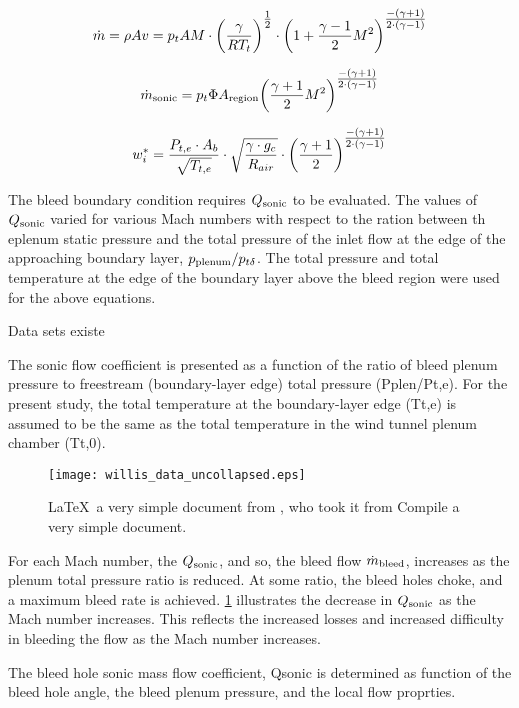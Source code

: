 \documentclass{article}
\begin{document}
$$ \dot{m} = \rho A v = p_t A M \cdot \qty(\frac{\gamma}{RT_t})^{\textstyle\frac{1}{2}} \cdot \qty(1 + \frac{\gamma-1}{2}M^2)^{\textstyle\frac{-\qty(\gamma+1)}{2\cdot\qty(\gamma-1)}} $$

$$ \dot{m}_{\textrm{sonic}} = p_t \Phi A_{\textrm{region}} \qty(\frac{\gamma+1}{2}M^2)^{\textstyle\frac{-\qty(\gamma+1)}{2\cdot\qty(\gamma-1)}} $$

$$ w_i^* = \frac{P_{t,e}\cdot A_b }{\sqrt{T_{t,e}}} \cdot \sqrt{\frac{\gamma\cdot g_c}{R_{air}}} \cdot \qty(\frac{\gamma+1}{2})^{\textstyle\frac{-\qty(\gamma+1)}{2\cdot\qty(\gamma-1)}} $$

The bleed boundary condition requires $Q_{\textrm{sonic}}$ to be evaluated. The values of $Q_{\textrm{sonic}}$ varied for various Mach numbers with respect to the ration between th eplenum static pressure and the total pressure of the inlet flow at the edge of the approaching boundary layer, $p_{\textrm{plenum}}/p_{t\delta}$. The total pressure and total temperature at the edge of the boundary layer above the bleed region were used for the above equations.

Data sets existe

The sonic flow coefficient is presented as a function of the ratio of bleed plenum pressure to freestream (boundary-layer edge) total pressure (Pplen/Pt,e). For the present study, the total temperature at the boundary-layer edge (Tt,e) is assumed to be the same as the total temperature in the wind tunnel plenum chamber (Tt,0).

\begin{figure}[htbp]
 \begin{center}
    \texttt{[image: willis\_data\_uncollapsed.eps]}
     \caption{\LaTeX\ a very simple document from \cite{Slater2012}, who took it from \cite{Willis1995} Compile a very simple document.}
     \label{fig:MyFirstLaTeX}
 \end{center}
\end{figure}

For each Mach number, the $Q_{\textrm{sonic}}$, and so, the bleed flow $\dot{m}_{\textrm{bleed}}$, increases as the plenum total pressure ratio is reduced. At some ratio, the bleed holes choke, and a maximum bleed rate is achieved. \cref{fig:MyFirstLaTeX} illustrates the decrease in $Q_{\textrm{sonic}}$ as the Mach number increases. This reflects the increased losses and increased difficulty in bleeding the flow as the Mach number increases.

The bleed hole sonic mass flow coefficient, Qsonic is determined as function of the bleed hole angle, the bleed plenum pressure, and the local flow proprties. 
\end{document}
